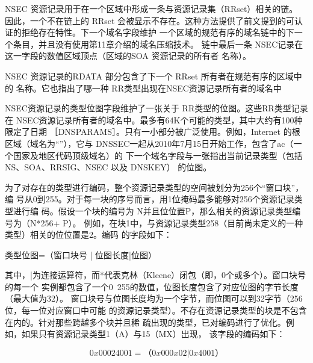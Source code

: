 NSEC 资源记录用于在一个区域中形成一条与资源记录集（RRset）相关的链。
因此，一个不在链上的 RRset 会被显示不存在。这种方法提供了前文提到的可认
证的拒绝存在特性。下一个域名字段维护
一个区域的规范有序的域名链中的下一个条目，并且没有使用第11章介绍的域名压缩技术。
链中最后一条 NSEC记录在这一字段的数值区域顶点（区域的SOA 资源记录的所有者
名称）。

NSEC 资源记录的RDATA 部分包含了下一个 RRset 所有者在规范有序的区域中的
名称。它也指出了哪一种 RR类型出现在NSEC资源记录所有者的域名中


NSEC资源记录的类型位图字段维护了一张关于 RR类型的位图。这些RR类型记录在
NSEC资源记录所有者的域名中。最多有64K个可能的类型，其中大约有100种限定了日期
［DNSPARAMS］。只有一小部分被广泛使用。例如，Internet 的根区域（域名为“”），它与
DNSSEC一起从2010年7月15日开始工作，包含了ac（一个国家及地区代码顶级域名）的
下一个域名字段与一张指出当前记录类型（包括NS、SOA、RRSIG、NSEC 以及 DNSKEY）
的位图。

为了对存在的类型进行编码，整个资源记录类型的空间被划分为256个“窗口块”，编
号从0到255。对于每一块的序号而言，用1位掩码最多能够对256个资源记录类型进行编
码。假设一个块的编号为 N并且位位置P，那么相关的资源记录类型编号为（N*256+ P）。
例如，在块1中，与资源记录类型258（目前尚未定义的一种类型）相关的位位置是2。编码
的字段如下：

类型位图=（窗口块号 | 位图长度|位图）

其中，|为连接运算符，而*代表克林（Kleene）闭包（即，0个或多个）。窗口块号的每一个
实例都包含了一个0~255的数值，位图长度包含了对应位图的字节长度（最大值为32）。
窗口块号与位图长度均为一个字节，而位图可以到32字节（256位，每一位对应窗口中可能
的资源记录类型）。不存在资源记录类型的块是不包含在内的。针对那些跨越多个块并且稀
疏出现的类型，已对编码进行了优化。例如，如果只有资源记录类型1（A）与15（MX）出现，
该字段的编码如下：

\begin{equation}
    0x00024001=（0x000x02|0x4001）
\end{equation}

